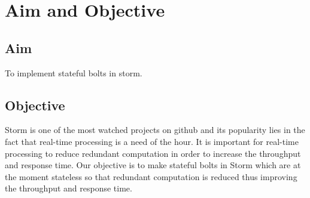 \section{Aim and Objective} 
\subsection{Aim}
To implement stateful bolts in storm.
\subsection{Objective}
Storm is one of the most watched projects on github and its popularity lies in the fact that real-time processing is a need of the hour. It is important for real-time processing to reduce redundant computation in order to increase the throughput and response time. Our objective is to make stateful bolts in Storm which are at the moment stateless so that redundant computation is reduced thus improving the throughput and response time.

